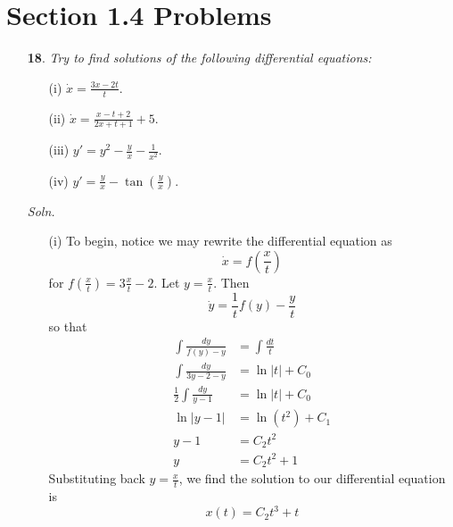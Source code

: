\documentclass{article}
\begin{document}
\section*{Section 1.4 Problems}
\begin{itemize}
    \item[\textbf{18}.]
    \textit{Try to find solutions of the following differential equations:}
    \begin{itemize}
        \item[(i)] $\dot{x} = \frac{3x - 2t}{t}$.

        \item[(ii)] $\dot{x} = \frac{x - t + 2}{2x + t + 1} + 5$.

        \item[(iii)] $y' = y^2 - \frac{y}{x} - \frac{1}{x^2}$.

        \item[(iv)] $y' = \frac{y}{x} - \tan\left(\frac{y}{x}\right)$.
    \end{itemize}

    \textit{Soln.}
    \begin{itemize}
        \item[(i)] To begin, notice we may rewrite the differential equation as
        \[\dot{x} = f\left(\frac{x}{t}\right)\]
        for $f\left(\frac{x}{t}\right) = 3\frac{x}{t} - 2$. Let $y = \frac{x}{t}$. Then
        \[\dot{y} = \frac{1}{t}f(y) - \frac{y}{t}\]
        so that
        \begin{align*}
            \int\frac{dy}{f(y) - y} &= \int\frac{dt}{t}\\
            \int\frac{dy}{3y - 2 - y} &= \ln|t| + C_0\\
            \frac{1}{2}\int\frac{dy}{y-1} &= \ln|t| + C_0\\
            \ln|y-1| &= \ln(t^2) + C_1\\
            y - 1 &= C_2t^2\\
            y &= C_2t^2 + 1
        \end{align*}
        Substituting back $y = \frac{x}{t}$, we find the solution to our differential equation is
        \[x(t) = C_2t^3 + t\]
        


\end{itemize}
\end{itemize}
\end{document}

